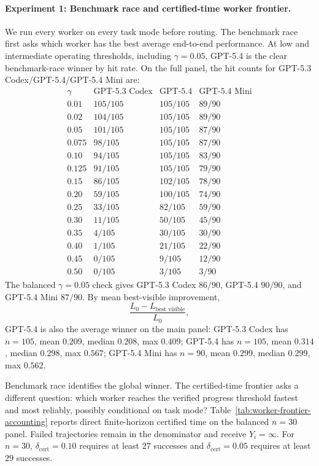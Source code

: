 \documentclass{article}
\newcommand{\newtext}[1]{\textcolor{green!50!black}{#1}}
\begin{document}
\paragraph{\newtext{Experiment 1: Benchmark race and certified-time worker frontier.}}
{\color{green!50!black}
We run every worker on every task mode before routing.
The benchmark race first asks which worker has the best average end-to-end performance.
At low and intermediate operating thresholds, including \(\gamma=0.05\), GPT-5.4 is the clear benchmark-race winner by hit rate.
On the full panel, the hit counts for GPT-5.3 Codex/GPT-5.4/GPT-5.4 Mini are:
\[
\begin{array}{c|ccc}
\gamma & \text{GPT-5.3 Codex} & \text{GPT-5.4} & \text{GPT-5.4 Mini}\\
\hline
0.01&105/105&105/105&89/90\\
0.02&104/105&105/105&89/90\\
0.05&101/105&105/105&87/90\\
0.075&98/105&105/105&87/90\\
0.10&94/105&105/105&83/90\\
0.125&91/105&105/105&79/90\\
0.15&86/105&102/105&78/90\\
0.20&59/105&100/105&74/90\\
0.25&33/105&82/105&59/90\\
0.30&11/105&50/105&45/90\\
0.35&4/105&30/105&30/90\\
0.40&1/105&21/105&22/90\\
0.45&0/105&9/105&12/90\\
0.50&0/105&3/105&3/90
\end{array}
\]
The balanced \(\gamma=0.05\) check gives GPT-5.3 Codex \(86/90\), GPT-5.4 \(90/90\), and GPT-5.4 Mini \(87/90\).
By mean best-visible improvement,
\[
\frac{L_0-L_{\text{best visible}}}{L_0},
\]
GPT-5.4 is also the average winner on the main panel: GPT-5.3 Codex has \(n=105\), mean \(0.209\), median \(0.208\), max \(0.409\); GPT-5.4 has \(n=105\), mean \(0.314\), median \(0.298\), max \(0.567\); GPT-5.4 Mini has \(n=90\), mean \(0.299\), median \(0.299\), max \(0.562\).

Benchmark race identifies the global winner.
The certified-time frontier asks a different question: which worker reaches the verified progress threshold fastest and most reliably, possibly conditional on task mode?
Table~\ref{tab:worker-frontier-accounting} reports direct finite-horizon certified time on the balanced \(n=30\) panel.
Failed trajectories remain in the denominator and receive \(Y_i=\infty\).
For \(n=30\), \(\delta_{\mathrm{cert}}=0.10\) requires at least \(27\) successes and \(\delta_{\mathrm{cert}}=0.05\) requires at least \(29\) successes.
}
\end{document}
